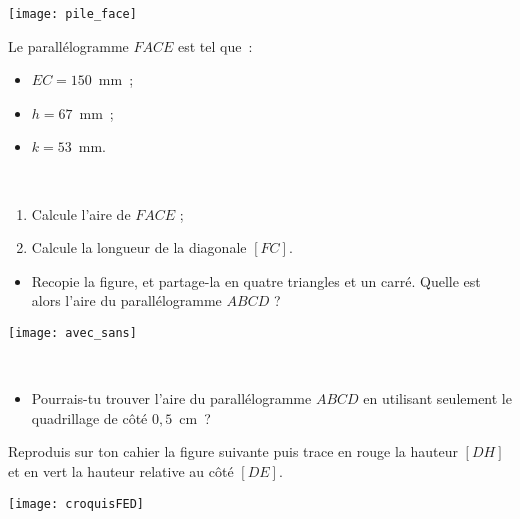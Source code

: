\begin{exercice}
\begin{minipage}[c]{0.38\linewidth}
\texttt{[image: pile\_face]}
 \end{minipage} \hfill%
 \begin{minipage}[c]{0.58\linewidth}
Le parallélogramme $FACE$ est tel que :
 \begin{itemize}
  \item $EC = 150$ mm ;
  \item $h = 67$ mm ;
  \item $k = 53$ mm.
  \end{itemize}
  \end{minipage} \\
  \begin{enumerate}
   \item Calcule l'aire de $FACE$ ;
   \item Calcule la longueur de la diagonale $[FC]$.
   \end{enumerate}
\end{exercice}


\begin{exercice}
\begin{minipage}[c]{0.48\linewidth}
\begin{itemize}
 \item Recopie la figure, et partage-la en quatre triangles et un carré. Quelle est alors l'aire du parallélogramme $ABCD$ ?
 \end{itemize}
 \end{minipage} \hfill%
 \begin{minipage}[c]{0.48\linewidth}
\begin{center} \texttt{[image: avec\_sans]} \end{center} 
  \end{minipage} \\
  \begin{itemize}
   \item Pourrais-tu trouver l'aire du parallélogramme $ABCD$ en utilisant seulement le quadrillage de côté $0,5$ cm ? 
   \end{itemize}
\end{exercice}


\begin{exercice}
\begin{minipage}[c]{0.48\linewidth}
Reproduis sur ton cahier la figure suivante puis trace en rouge la hauteur $[DH]$ et en vert la hauteur relative au côté $[DE]$.
 \end{minipage} \hfill%
 \begin{minipage}[c]{0.48\linewidth}
\begin{center} \texttt{[image: croquisFED]} \end{center} 
  \end{minipage} \\
\end{exercice}


